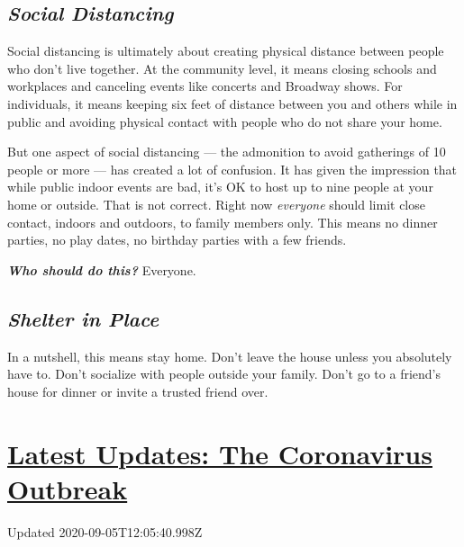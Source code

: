 \hypertarget{social-distancing}{%
\subsection{\texorpdfstring{\emph{Social
Distancing}}{Social Distancing}}\label{social-distancing}}

Social distancing is ultimately about creating physical distance between
people who don't live together. At the community level, it means closing
schools and workplaces and canceling events like concerts and Broadway
shows. For individuals, it means keeping six feet of distance between
you and others while in public and avoiding physical contact with people
who do not share your home.

But one aspect of social distancing --- the admonition to avoid
gatherings of 10 people or more --- has created a lot of confusion. It
has given the impression that while public indoor events are bad, it's
OK to host up to nine people at your home or outside. That is not
correct. Right now \emph{everyone} should limit close contact, indoors
and outdoors, to family members only. This means no dinner parties, no
play dates, no birthday parties with a few friends.

\emph{\textbf{Who should do this?}} Everyone.

\hypertarget{shelter-in-place}{%
\subsection{\texorpdfstring{\emph{Shelter in
Place}}{Shelter in Place}}\label{shelter-in-place}}

In a nutshell, this means stay home. Don't leave the house unless you
absolutely have to. Don't socialize with people outside your family.
Don't go to a friend's house for dinner or invite a trusted friend over.

\hypertarget{latest-updates-the-coronavirus-outbreak}{%
\section{\texorpdfstring{\href{https://www.nytimes3xbfgragh.onion/2020/09/04/world/covid-19-coronavirus.html?action=click\&pgtype=Article\&state=default\&region=MAIN_CONTENT_1\&context=storylines_live_updates}{Latest
Updates: The Coronavirus
Outbreak}}{Latest Updates: The Coronavirus Outbreak}}\label{latest-updates-the-coronavirus-outbreak}}

Updated 2020-09-05T12:05:40.998Z

